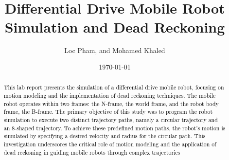 \documentclass[letterpaper,12pt]{article}
\begin{document}
\title{Differential Drive Mobile Robot Simulation and Dead Reckoning}
\author{Loc Pham,  and Mohamed Khaled}
\date{\today}
\maketitle

\begin{abstract}
\textcolor{black}{This lab report presents the simulation of a differential drive mobile robot, focusing on motion modeling and the implementation of dead reckoning techniques. The mobile robot operates within two frames: the N-frame, the world frame, and the robot body frame, the B-frame. The primary objective of this study was to program the robot simulation to execute two distinct trajectory paths, namely a circular trajectory and an 8-shaped trajectory. To achieve these predefined motion paths, the robot's motion is simulated by specifying a desired velocity and radius for the circular path. This investigation underscores the critical role of motion modeling and the application of dead reckoning in guiding mobile robots through complex trajectories}
\end{abstract}

   
\end{document}
